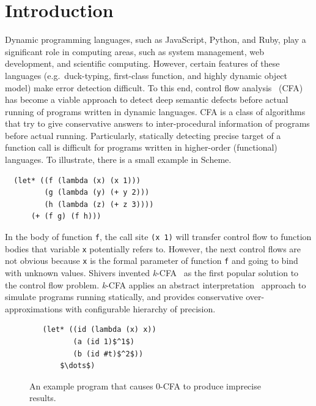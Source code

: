 \documentclass{article}
\begin{document}
\section{Introduction}
\label{Introduction}
Dynamic programming languages, such as JavaScript, Python, and Ruby, play a significant role in computing areas, such as system management, web development, and scientific computing.
However, certain features of these languages (e.g.\ duck-typing, first-class function, and highly dynamic object model) make error detection difficult.
To this end, control flow analysis~\cite{midtgaard2012control}
 (CFA) has become a viable approach to detect deep semantic defects before actual running of programs written in dynamic languages.
CFA is a class of algorithms that try to give conservative answers to inter-procedural information of programs before actual running.
Particularly, statically detecting precise target of a function call is difficult for programs written in higher-order (functional) languages.
To illustrate, there is a small example in Scheme.
\begin{lstlisting}
  (let* ((f (lambda (x) (x 1)))
         (g (lambda (y) (+ y 2)))
         (h (lambda (z) (+ z 3))))
      (+ (f g) (f h)))
\end{lstlisting}
In the body of function \verb|f|, the call site \verb|(x 1)| will transfer control flow to function bodies that variable \verb|x| potentially refers to.
However, the next control flows are not obvious because \verb|x| is the formal parameter of function \verb|f| and going to bind with unknown values.
Shivers invented \textit{k}-CFA~\cite{shivers1991control}
as the first popular solution to the control flow problem.
\textit{k}-CFA applies an abstract interpretation~\cite{cousot1977abstract}
 approach to simulate programs running statically, and provides conservative over-approximations with configurable hierarchy of precision.


 \begin{figure}
 \begin{lstlisting}
   (let* ((id (lambda (x) x))
          (a (id 1)$^1$)
          (b (id #t)$^2$))
       $\dots$)
 \end{lstlisting}
 \caption{An example program that causes 0-CFA to produce imprecise results.}
 \label{fig:eg1}
 \end{figure}
\end{document}
